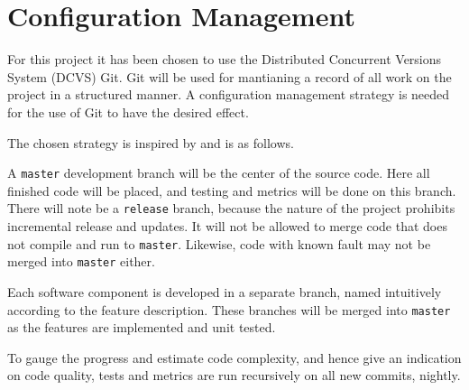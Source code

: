\documentclass[Main_Assignment3]{subfiles}
\begin{document}
	\section{Configuration Management} %
		\label{sec:configuration_management}
		For this project it has been chosen to use the Distributed Concurrent Versions System (DCVS) Git.
		Git will be used for mantianing a record of all work on the project in a structured manner.
		A configuration management strategy is needed for the use of Git to have the desired effect.

		The chosen strategy is inspired by \cite{vincentdriessen2010} and is as follows.

		A \texttt{master} development branch will be the center of the source code. Here all finished code will be placed, and testing and metrics will be done on this branch.
		There will note be a \texttt{release} branch, because the nature of the project prohibits incremental release and updates.
		It will not be allowed to merge code that does not compile and run to \texttt{master}.
		Likewise, code with known fault may not be merged into \texttt{master} either.

		Each software component is developed in a separate branch, named intuitively according to the feature description.
		These branches will be merged into \texttt{master} as the features are implemented and unit tested.

		To gauge the progress and estimate code complexity, and hence give an indication on code quality, tests and metrics are run recursively on all new commits, nightly.

\end{document}
